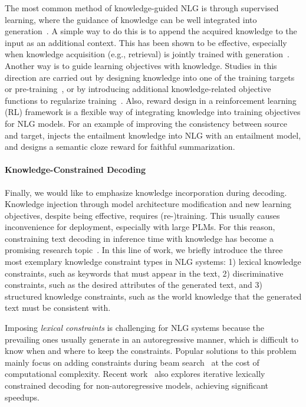 The most common method of knowledge-guided NLG is through supervised learning, where the guidance of knowledge can be well integrated into generation~\cite{yu2022survey}.
A simple way to do this is to append the acquired knowledge to the input as an additional context.
This has been shown to be effective, especially when knowledge acquisition (e.g., retrieval) is jointly trained with generation~\cite{pmlr-v119-guu20a,NEURIPS2020_6b493230}.
Another way is to guide learning objectives with knowledge.
Studies in this direction are carried out by designing knowledge into one of the training targets~\cite{cao-etal-2020-unsupervised-dual} or pre-training~\cite{guan-etal-2020-knowledge}, or by introducing additional knowledge-related objective functions to regularize training~\cite{hu2018deep}.
Also, reward design in a reinforcement learning (RL) framework is a flexible way of integrating knowledge into training objectives for NLG models.
For an example of improving the consistency between source and target, \cite{li2018ensure} injects the entailment knowledge into NLG with an entailment model, and \cite{huang-etal-2020-knowledge} designs a semantic cloze reward for faithful summarization.

\paragraph{Knowledge-Constrained Decoding}

Finally, we would like to emphasize knowledge incorporation during decoding.
Knowledge injection through model architecture modification and new learning objectives, despite being effective, requires (re-)training.
This usually causes inconvenience for deployment, especially with large PLMs.
For this reason, constraining text decoding in inference time with knowledge has become a promising research topic~\cite{zhang2022survey,garbacea2022constrained}.
In this line of work, we briefly introduce the three most exemplary knowledge constraint types in NLG systems:
1) lexical knowledge constraints, such as keywords that must appear in the text,
2) discriminative constraints, such as the desired attributes of the generated text, and
3) structured knowledge constraints, such as the world knowledge that the generated text must be consistent with.



Imposing \textit{lexical constraints} is challenging for NLG systems because the prevailing ones usually generate in an autoregressive manner, which is difficult to know when and where to keep the constraints.
Popular solutions to this problem mainly focus on adding constraints during beam search~\cite{hokamp-liu-2017-lexically,post-vilar-2018-fast,lu-etal-2021-neurologic} at the cost of computational complexity.
Recent work~\cite{susanto-etal-2020-lexically,10.1162/tacl_a_00368} also explores iterative lexically constrained decoding for non-autoregressive models, achieving significant speedups.

